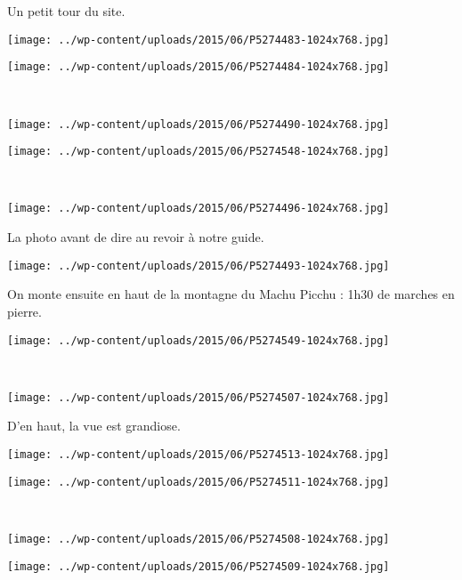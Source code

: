 Un petit tour du site.
\begin{center} \texttt{[image: ../wp-content/uploads/2015/06/P5274483-1024x768.jpg]} \end{center}
\begin{center} \texttt{[image: ../wp-content/uploads/2015/06/P5274484-1024x768.jpg]} \end{center}
\vspace{-\topsep}
\vspace{-3.25mm}
\pagebreak
~
\begin{center} \texttt{[image: ../wp-content/uploads/2015/06/P5274490-1024x768.jpg]} \end{center}
\begin{center} \texttt{[image: ../wp-content/uploads/2015/06/P5274548-1024x768.jpg]} \end{center}
\vspace{-\topsep}
\vspace{-3.25mm}
\pagebreak
~\\
\begin{center} \texttt{[image: ../wp-content/uploads/2015/06/P5274496-1024x768.jpg]} \end{center}

La photo avant de dire au revoir à notre guide. 
\begin{center} \texttt{[image: ../wp-content/uploads/2015/06/P5274493-1024x768.jpg]} \end{center}
\vspace{-\topsep}
\pagebreak

On monte ensuite en haut de la montagne du Machu Picchu : 1h30 de marches en pierre. 
\begin{center} \texttt{[image: ../wp-content/uploads/2015/06/P5274549-1024x768.jpg]} \end{center}
~
\begin{center} \texttt{[image: ../wp-content/uploads/2015/06/P5274507-1024x768.jpg]} \end{center}
\vspace{-\topsep}
\pagebreak

D'en haut, la vue est grandiose.
\begin{center} \texttt{[image: ../wp-content/uploads/2015/06/P5274513-1024x768.jpg]} \end{center}
\begin{center} \texttt{[image: ../wp-content/uploads/2015/06/P5274511-1024x768.jpg]} \end{center}
\vspace{-\topsep}
\vspace{-3.25mm}
\pagebreak
~
\begin{center} \texttt{[image: ../wp-content/uploads/2015/06/P5274508-1024x768.jpg]} \end{center}
\begin{center} \texttt{[image: ../wp-content/uploads/2015/06/P5274509-1024x768.jpg]} \end{center}

